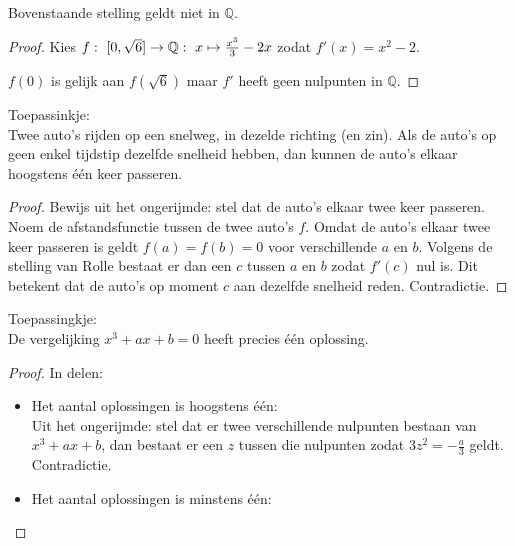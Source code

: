 \documentclass[main.tex]{subfiles}
\begin{document}
\begin{tvb}
  Bovenstaande stelling geldt niet in $\mathbb{Q}$.

  \begin{proof}
    Kies $f:\ \interval{0}{\sqrt{6}} \rightarrow \mathbb{Q}:\ x \mapsto \frac{x^{3}}{3}-2x$ zodat $f'(x) = x^{2}-2$.
    \begin{figure}[H]
      \centering
    \end{figure}
    $f(0)$ is gelijk aan $f(\sqrt{6})$ maar $f'$ heeft geen nulpunten in $\mathbb{Q}$.
\feed
  \end{proof}
\end{tvb}


\begin{st}
  Toepassinkje:\\
  Twee auto's rijden op een snelweg, in dezelde richting (en zin).
  Als de auto's op geen enkel tijdstip dezelfde snelheid hebben, dan kunnen de auto's elkaar hoogstens \'e\'en keer passeren.

  \begin{proof}
    Bewijs uit het ongerijmde: stel dat de auto's elkaar twee keer passeren.\\
    Noem de afstandsfunctie tussen de twee auto's $f$.
    Omdat de auto's elkaar twee keer passeren is geldt $f(a)=f(b)=0$ voor verschillende $a$ en $b$.
    Volgens de stelling van Rolle bestaat er dan een $c$ tussen $a$ en $b$ zodat $f'(c)$ nul is.
    Dit betekent dat de auto's op moment $c$ aan dezelfde snelheid reden.
    Contradictie.
  \end{proof}
\end{st}

\begin{st}
  Toepassingkje:\\
  De vergelijking $x^{3}+ax+b =0$ heeft precies \'e\'en oplossing.
  \begin{proof}
    In delen:
    \begin{itemize}
    \item Het aantal oplossingen is hoogstens \'e\'en:\\
      Uit het ongerijmde: stel dat er twee verschillende nulpunten bestaan van $x^{3}+ax+b$, dan bestaat er een $z$ tussen die nulpunten zodat $3z^{2} = -\frac{a}{3}$ geldt.
      Contradictie.
    \item Het aantal oplossingen is minstens \'e\'en:\\
    \end{itemize}
  \end{proof}
\end{st}
\end{document}
